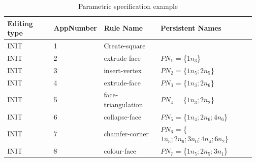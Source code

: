 \begin{table}[ht]
\caption{\label{tbl:param-spec-example}Parametric specification example}
\centering
\begin{tabularx}{\textwidth}{|l|l|l|X|}
\hline
Editing type & AppNumber & Rule Name & Persistent Names\\[0pt]
\hline
INIT & 1 & Create-square & \\[0pt]
\hline
INIT & 2 & extrude-face & \(PN_{1}\) = \{\(1n_{3}\)\}\\[0pt]
\hline
INIT & 3 & insert-vertex & \(PN_{2}\) = \{\(1n_{5}; 2n_{5}\)\}\\[0pt]
\hline
INIT & 4 & extrude-face & \(PN_{3}\) = \{\(1n_{3}; 2n_{6}\)\}\\[0pt]
\hline
INIT & 5 & face-triangulation & \(PN_{4}\) = \{\(1n_{3}; 2n_{2}\)\}\\[0pt]
\hline
INIT & 6 & collapse-face & \(PN_{5}\) = \{\(1n_{4}; 2n_{6}; 4n_{6}\)\}\\[0pt]
\hline
INIT & 7 & chamfer-corner & \(PN_{6}\) = \{\(1n_{5}; 2n_{6}; 3n_{0}; 4n_{4}; 6n_{2}\)\}\\[0pt]
\hline
INIT & 8 & colour-face & \(PN_{7}\) = \{\(1n_{5}; 2n_{5}; 3n_{1}\)\}\\[0pt]
\hline
\end{tabularx}
\end{table}

